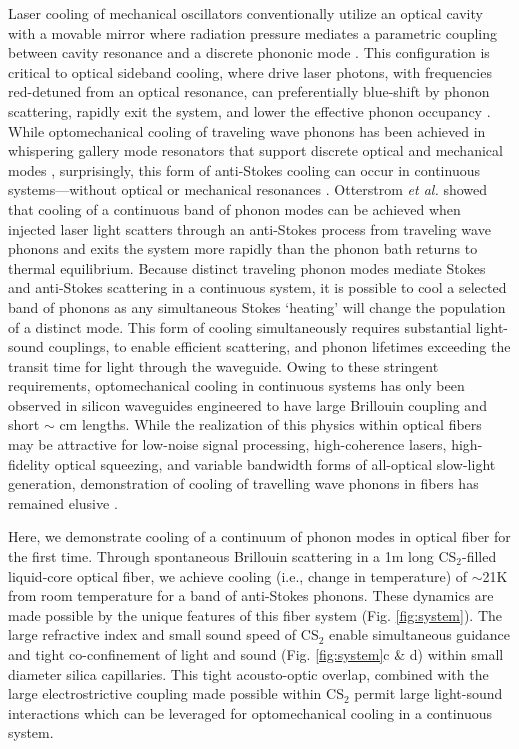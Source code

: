 Laser cooling of mechanical oscillators conventionally utilize an optical cavity with a movable mirror where radiation pressure mediates a parametric coupling between cavity resonance and a discrete phononic mode \cite{aspelmeyer2014cavity}. This configuration is critical to optical sideband cooling, where drive laser photons, with frequencies red-detuned from an optical resonance, can preferentially blue-shift by phonon scattering, rapidly exit the system, and lower the effective phonon occupancy \cite{aspelmeyer2014cavity}. While optomechanical cooling of traveling wave phonons has been achieved in whispering gallery mode resonators that support discrete optical and mechanical modes \cite{bahl2012observation}, surprisingly, this form of anti-Stokes cooling can occur in continuous systems---without optical or mechanical resonances \cite{otterstrom2018optomechanical}. Otterstrom {\it et al.} showed that cooling of a continuous band of phonon modes can be achieved when injected laser light scatters through an anti-Stokes process from traveling wave phonons and exits the system more rapidly than the phonon bath returns to thermal equilibrium.  Because distinct traveling phonon modes mediate Stokes and anti-Stokes scattering in a continuous system, it is possible to cool a selected band of phonons as any simultaneous Stokes `heating' will change the population of a distinct mode. This form of cooling simultaneously requires substantial light-sound couplings, to enable efficient scattering, and phonon lifetimes exceeding the transit time for light through the waveguide. Owing to these stringent requirements, optomechanical cooling in continuous systems has only been observed in silicon waveguides engineered to have large Brillouin coupling and short $\sim$ cm lengths. While the realization of this physics within optical fibers may be attractive for low-noise signal processing, high-coherence lasers, high-fidelity optical squeezing, and variable bandwidth forms of all-optical slow-light generation, demonstration of cooling of travelling wave phonons in fibers has remained elusive \cite{shin2015control,shelby1986generation,okawachi2005tunable}.

Here, we demonstrate cooling of a continuum of phonon modes in optical fiber for the first time. Through spontaneous Brillouin scattering in a 1m long CS$_2$-filled liquid-core optical fiber, we achieve cooling (i.e., change in temperature) of $\sim$21K from room temperature for a band of anti-Stokes phonons. These dynamics are made possible by the unique features of this fiber system (Fig. \ref{fig:system})\cite{kieu2013brillouin,kieu2014nonlinear,behunin2019spontaneous}. The large refractive index and small sound speed of CS$_2$ enable simultaneous guidance and tight co-confinement of light and sound (Fig. \ref{fig:system}c \& d) within small diameter silica capillaries. This tight acousto-optic overlap, combined with the large electrostrictive coupling made possible within CS$_2$ \cite{boyd2020nonlinear} permit large light-sound interactions which can be leveraged for optomechanical cooling in a continuous system.

